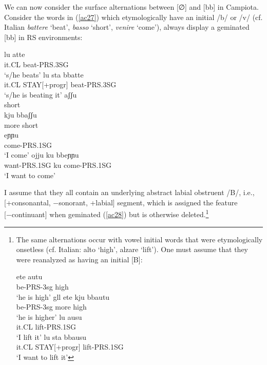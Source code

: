 \documentclass[output=paper]{langscibook}
\begin{document}
We can now consider the surface alternations between [∅] and [bb] in Campiota.  Consider the words in (\ref{ac27}) which etymologically have an initial /b/ or /v/ (cf. Italian \textit{battere} ‘beat’, \textit{basso} ‘short’, \textit{venire} ‘come’), always display a geminated [bb] in RS environments:

\ea\label{ac27}
    \ea\label{ac27a}
        \ea \label{ac27ai}\gll lu atte\\
            it.CL beat-PRS.3SG\\  
            \glt `s/he beats'  
        \ex \label{ac27aii}\gll lu   sta     bbatte\\
            it.CL STAY[+progr] beat-PRS.3SG\\
            \glt `s/he is beating it'
        \z
    \ex\label{ac27b}
        \ea \label{ac27bi}\gll aʃʃu\\
                short\\
        \ex \label{ac27bii}\gll kju     bbaʃʃu\\
                more    short\\
        \z
    \ex\label{ac27c}
        \ea \label{ac27ci}\gll eɲɲu\\
            come-PRS.1SG\\ 
            \glt `I come'   
        \ex \label{ac27cii}\gll ojju      ku   bbeɲɲu\\
            want-PRS.1SG ku   come-PRS.1SG\\
            \glt `I want to come' 
        \z
    \z
\z

I assume that they all contain an underlying abstract labial obstruent /B/, i.e., [+consonantal, −sonorant, +labial] segment, which is assigned the feature [−continuant] when geminated (\ref{ac28}) but is otherwise deleted.\footnote{The same alternations occur with vowel initial words that were etymologically onsetless (cf. Italian: alto `high', alzare `lift').  One must assume that they were reanalyzed as having an initial [B]:

\ea \label{fn14ex}
    \ea \label{fn14exa}
        \ea \label{fn14exai}\gll ete autu\\
            be-PRS-3sg high\\
            \glt ‘he is high’    
        \ex \label{fn14exaii}gll ete kju bbautu\\
            be-PRS-3sg more high\\
            \glt ‘he is higher’
        \z
    \ex \label{fn14exb}
        \ea \label{fn14exbi}\gll lu ausu\\
            it.CL lift-PRS.1SG\\
            \glt ‘I lift it’  
        \ex \label{fn14exbii}\gll lu sta bbausu\\
            it.CL STAY[+progr]  lift-PRS.1SG\\
            \glt ‘I want to lift it’
        \z
    \z
\z

}
\end{document}
